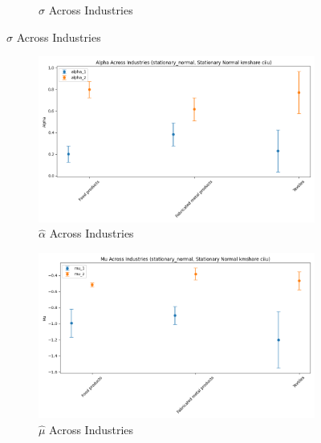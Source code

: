 \documentclass{article}
\begin{document}
\begin{figure}[ht!]
\begin{subfigure}[t]{0.32\textwidth}
        \caption{$\hat\sigma$ Across Industries}
    \end{subfigure}
\end{figure}

\begin{figure}[ht!]
    \centering 
    \caption{I.I.D Normal Model Across Industries}
    \begin{subfigure}[t]{0.32\textwidth}
        \centering
        \includegraphics[width=\textwidth]{figure/stationary_normal_kmshare_ciiu_alpha_across_industries.png}
        \caption{$\hat\alpha$ Across Industries}
    \end{subfigure}
    \begin{subfigure}[t]{0.32\textwidth}
        \centering
        \includegraphics[width=\textwidth]{figure/stationary_normal_kmshare_ciiu_mu_across_industries.png}
        \caption{$\hat\mu$ Across Industries}
    \end{subfigure}
    \begin{subfigure}[t]{0.32\textwidth}
        \centering

\end{subfigure}
\end{figure}
\end{document}
